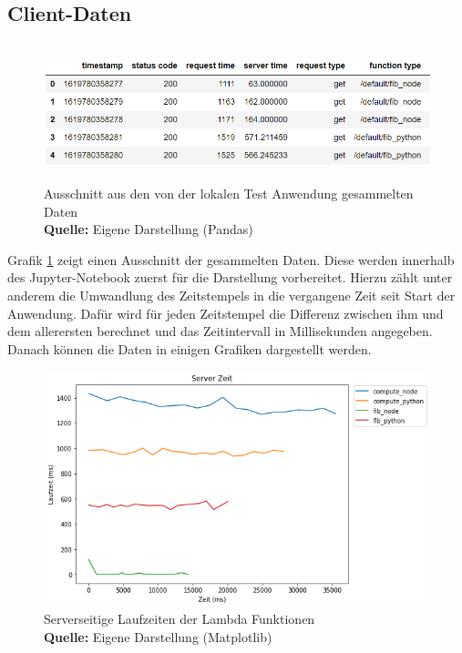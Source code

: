 \documentclass[12pt,a4paper,parskip=half]{scrreprt}
\newcommand*{\captionsource}[2]{%
	\caption[{#1}]{%
		#1%
		\\\hspace{\linewidth}%
		\textbf{Quelle:} #2%
	}%
}
\begin{document}
\subsection{Client-Daten}

\FloatBarrier
\begin{figure}[h!]
	\centering
	\includegraphics[width=13cm, height=4cm]{LocalDataExample}
	\captionsource{Ausschnitt aus den von der lokalen Test Anwendung gesammelten Daten}
	{Eigene Darstellung (Pandas)}
	\label{LocalDFHead}
\end{figure}
\FloatBarrier

Grafik \ref{LocalDFHead} zeigt einen Ausschnitt der gesammelten Daten. Diese werden innerhalb des Jupyter-Notebook zuerst für die Darstellung vorbereitet. Hierzu zählt unter anderem die Umwandlung des Zeitstempels in die vergangene Zeit seit Start der Anwendung. Dafür wird für jeden Zeitstempel die Differenz zwischen ihm und dem allerersten berechnet und das Zeitintervall in Millisekunden angegeben. Danach können die Daten in einigen Grafiken dargestellt werden.
\\

\FloatBarrier
\begin{figure}[h!]
	\centering
	\includegraphics[scale=0.7]{aw_c_server_full}
	\captionsource{Serverseitige Laufzeiten der Lambda Funktionen}
	{Eigene Darstellung (Matplotlib)}
	\label{aw_c_server_full}
\end{figure}
\FloatBarrier
\end{document}
